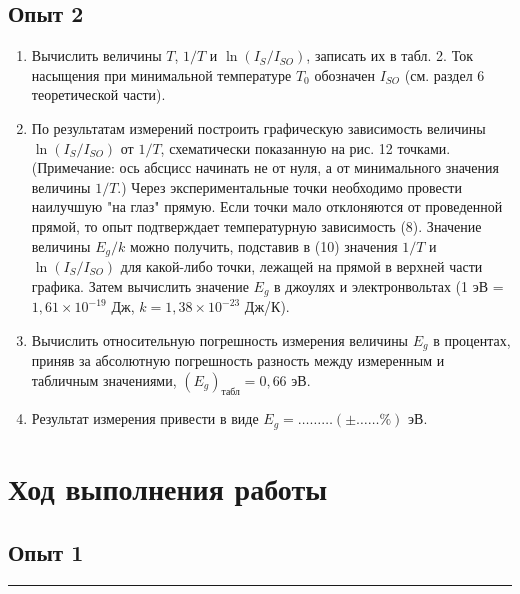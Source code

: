 \documentclass[a4paper, 14pt]{extarticle}
\begin{document}
\subsection*{Опыт 2}

\begin{enumerate}
    \item Вычислить величины $T$, $1 / T$ и $\ln \left(I_{S} / I_{S O}\right)$, записать их в табл. 2. Ток насыщения при минимальной температуре $T_{0}$ обозначен $I_{S O}$ (см. раздел 6 теоретической части).
    \item По результатам измерений построить графическую зависимость величины $\ln \left(I_{S} / I_{S O}\right)$ от $1 / T$, схематически показанную на рис. 12 точками. (Примечание: ось абсцисс начинать не от нуля, а от минимального значения величины $1 / T$.) Через экспериментальные точки необходимо провести наилучшую "на глаз" прямую. Если точки мало отклоняются от проведенной прямой, то опыт подтверждает температурную зависимость (8). Значение величины $E_{g} / k$ можно получить, подставив в (10) значения $1 / T$ и $\ln \left(I_{S} / I_{S O}\right)$ для какой-либо точки, лежащей на прямой в верхней части графика. Затем вычислить значение $E_{g}$ в джоулях и электронвольтах (1 эВ = $1,61 \times 10^{-19}$ Дж, $k = 1,38 \times 10^{-23}$ Дж/К).
    \item Вычислить относительную погрешность измерения величины $E_{g}$ в процентах, приняв за абсолютную погрешность разность между измеренным и табличным значениями, $\left(E_{g}\right)_{\text{табл}} = 0,66$ эВ.
    \item Результат измерения привести в виде $E_{g} = \ldots \ldots \ldots (\pm \ldots \ldots \%)$ эВ.
\end{enumerate}

\section*{Ход выполнения работы}

\subsection*{Опыт 1}\vspace{-20pt}\rule{\linewidth}{0.1mm}
\end{document}

